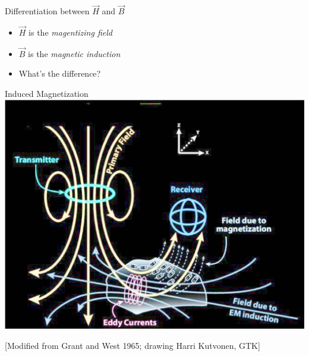    \begin{frame}
      \begin{PointSix}{Differentiation between $\vec{H}$ and $\vec{B}$}
         \begin{itemize}
          \item $\vec{H}$ is the \textit{magentizing field} 
          \item $\vec{B}$ is the \textit{magnetic induction}
          \item What's the difference?
        \end{itemize}
      \end{PointSix}
    \end{frame}

    \begin{frame}
      \begin{PointSix}{Induced Magnetization}
        \includegraphics[width=0.90\linewidth]{Figures/Magnetics/HBInduction_GrandAndWest1995_DrawingKulvonen.png}

        \tiny [Modified from Grant and West 1965; drawing Harri Kutvonen, GTK]

      \end{PointSix}
    \end{frame}

